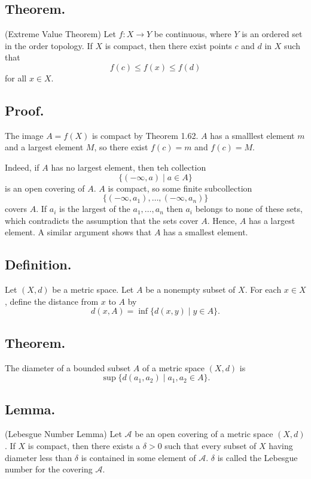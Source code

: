 \documentclass[titlepage]{article}
\begin{document}
\subsection{Theorem.} (Extreme Value Theorem) Let $f: X \to Y$ be continuous, where $Y$ is an ordered set in the order topology. If $X$ is compact, then there exist points $c$ and $d$ in $X$ such that $$f(c) \leq f(x) \leq f(d)$$ for all $x \in X$.

\subsection{Proof.} The image $A = f(X)$ is compact by Theorem 1.62. $A$ has a smalllest element $m$ and a largest element $M$, so there exist $f(c) = m$ and $f(c) = M$.

Indeed, if $A$ has no largest element, then teh collection 
$$\{(-\infty, a) \mid a \in A \}$$
is an open covering of $A$. $A$ is compact, so some finite subcollection 
$$\{(-\infty, a_{1}), \ldots, (-\infty, a_{n})\}$$
covers $A$. If $a_{i}$ is the largest of the $a_{1}, \ldots, a_{n}$ then $a_{i}$ belongs to none of these sets, which contradicts the assumption that the sets cover $A$. Hence, $A$ has a largest element. A similar argument shows that $A$ has a smallest element.

\subsection{Definition.} Let $(X, d)$ be a metric space. Let $A$ be a nonempty subset of $X$. For each $x \in X$, define the distance from $x$ to $A$ by 
$$d(x, A) = \inf \{d(x, y) \mid y \in A\}.$$

\subsection{Theorem.} The diameter of a bounded subset $A$ of a metric space $(X, d)$ is 
$$\sup \{d(a_{1}, a_{2}) \mid a_{1}, a_{2} \in A\}.$$

\subsection{Lemma.} (Lebesgue Number Lemma) Let $\mathcal{A}$ be an open covering of a metric space $(X, d)$. If $X$ is compact, then there exists a $\delta > 0$ such that every subset of $X$ having diameter less than $\delta$ is contained in some element of $\mathcal{A}$. $\delta$ is called the Lebesgue number for the covering $\mathcal{A}$.
\end{document}

